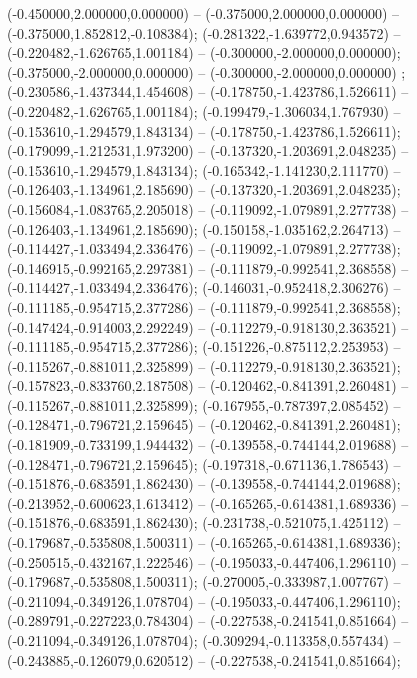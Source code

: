  (-0.450000,2.000000,0.000000) -- (-0.375000,2.000000,0.000000) -- (-0.375000,1.852812,-0.108384);
 (-0.281322,-1.639772,0.943572) -- (-0.220482,-1.626765,1.001184) -- (-0.300000,-2.000000,0.000000);
 (-0.375000,-2.000000,0.000000) -- (-0.300000,-2.000000,0.000000) ;
 (-0.230586,-1.437344,1.454608) -- (-0.178750,-1.423786,1.526611) -- (-0.220482,-1.626765,1.001184);
 (-0.199479,-1.306034,1.767930) -- (-0.153610,-1.294579,1.843134) -- (-0.178750,-1.423786,1.526611);
 (-0.179099,-1.212531,1.973200) -- (-0.137320,-1.203691,2.048235) -- (-0.153610,-1.294579,1.843134);
 (-0.165342,-1.141230,2.111770) -- (-0.126403,-1.134961,2.185690) -- (-0.137320,-1.203691,2.048235);
 (-0.156084,-1.083765,2.205018) -- (-0.119092,-1.079891,2.277738) -- (-0.126403,-1.134961,2.185690);
 (-0.150158,-1.035162,2.264713) -- (-0.114427,-1.033494,2.336476) -- (-0.119092,-1.079891,2.277738);
 (-0.146915,-0.992165,2.297381) -- (-0.111879,-0.992541,2.368558) -- (-0.114427,-1.033494,2.336476);
 (-0.146031,-0.952418,2.306276) -- (-0.111185,-0.954715,2.377286) -- (-0.111879,-0.992541,2.368558);
 (-0.147424,-0.914003,2.292249) -- (-0.112279,-0.918130,2.363521) -- (-0.111185,-0.954715,2.377286);
 (-0.151226,-0.875112,2.253953) -- (-0.115267,-0.881011,2.325899) -- (-0.112279,-0.918130,2.363521);
 (-0.157823,-0.833760,2.187508) -- (-0.120462,-0.841391,2.260481) -- (-0.115267,-0.881011,2.325899);
 (-0.167955,-0.787397,2.085452) -- (-0.128471,-0.796721,2.159645) -- (-0.120462,-0.841391,2.260481);
 (-0.181909,-0.733199,1.944432) -- (-0.139558,-0.744144,2.019688) -- (-0.128471,-0.796721,2.159645);
 (-0.197318,-0.671136,1.786543) -- (-0.151876,-0.683591,1.862430) -- (-0.139558,-0.744144,2.019688);
 (-0.213952,-0.600623,1.613412) -- (-0.165265,-0.614381,1.689336) -- (-0.151876,-0.683591,1.862430);
 (-0.231738,-0.521075,1.425112) -- (-0.179687,-0.535808,1.500311) -- (-0.165265,-0.614381,1.689336);
 (-0.250515,-0.432167,1.222546) -- (-0.195033,-0.447406,1.296110) -- (-0.179687,-0.535808,1.500311);
 (-0.270005,-0.333987,1.007767) -- (-0.211094,-0.349126,1.078704) -- (-0.195033,-0.447406,1.296110);
 (-0.289791,-0.227223,0.784304) -- (-0.227538,-0.241541,0.851664) -- (-0.211094,-0.349126,1.078704);
 (-0.309294,-0.113358,0.557434) -- (-0.243885,-0.126079,0.620512) -- (-0.227538,-0.241541,0.851664);
